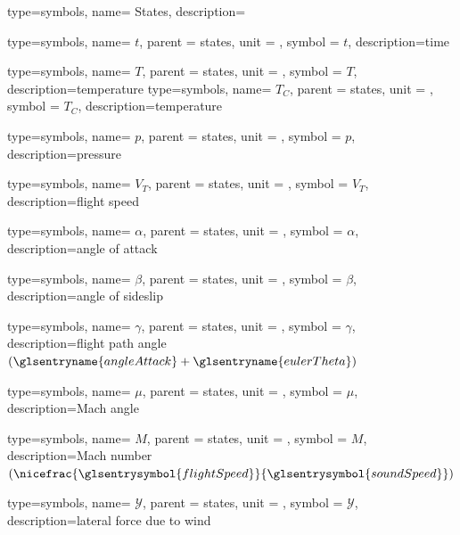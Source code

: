 {type=symbols,
	name= {States},
	description={}
}

{type=symbols,
	name= \ensuremath{t},
	parent = {states},
	unit = \unexpanded{\si{\second}},
	symbol = \ensuremath{t},
	description={time}
}

{type=symbols,
	name= \ensuremath{T},
	parent = {states},
	unit = \unexpanded{\si{\kelvin}},
	symbol = \ensuremath{T},
	description={temperature}
}
{type=symbols,
	name= \ensuremath{T_{C}},
	parent = {states},
	unit = \unexpanded{\si{\celsius}},
	symbol = \ensuremath{T_{C}},
	description={temperature}
}

{type=symbols,
	name= \ensuremath{p},
	parent = {states},
	unit = \unexpanded{\si{\pascal}},
	symbol = \ensuremath{p},
	description={pressure}
}

{type=symbols,
	name= \ensuremath{V_{T}},
	parent = {states},
	unit = \unexpanded{\si{\meter\per\second}},
	symbol = \ensuremath{V_{T}},
	description={flight speed}
}

{type=symbols,
	name= \ensuremath{\alpha},
	parent = {states},
	unit = \unexpanded{\si{\radian}},
	symbol = \ensuremath{\alpha},
	description={angle of attack}
}

{type=symbols,
	name= \ensuremath{\beta},
	parent = {states},
	unit = \unexpanded{\si{\radian}},
	symbol = \ensuremath{\beta},
	description={angle of sideslip}
}

{type=symbols,
	name= \ensuremath{\gamma},
	parent = {states},
	unit = \unexpanded{\si{\radian}},
	symbol = \ensuremath{\gamma},
	description={flight path angle $(\glsentryname{angleAttack}+\glsentryname{eulerTheta})$}
}

{type=symbols,
	name= \ensuremath{\mu},
	parent = {states},
	unit = \unexpanded{\si{\radian}},
	symbol = \ensuremath{\mu},
	description={Mach angle}
}

{type=symbols,
	name= \ensuremath{M},
	parent = {states},
	unit = \unexpanded{},
	symbol = \ensuremath{M},
	description={Mach number $(\nicefrac{\glsentrysymbol{flightSpeed}}{\glsentrysymbol{soundSpeed}})$}
}

{type=symbols,
	name= \ensuremath{\mathcal{Y}},
	parent = {states},
	unit = \unexpanded{\si{\newton}},
	symbol = \ensuremath{\mathcal{Y}},
	description={lateral force due to wind}
}

